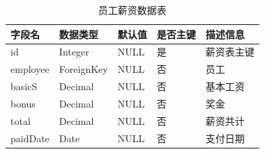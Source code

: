 \begin{table}[H]
    \centering
    \caption{员工薪资数据表}
    \label{tab:salarytab}
    \begin{tabularx}{.95\textwidth}{X<{\centering}X<{\centering}X<{\centering}X<{\centering}X<{\centering}}
        \toprule
        字段名 & 数据类型 & 默认值 & 是否主键 & 描述信息 \\
        \midrule
        id & Integer & NULL & 是 & 薪资表主键 \\
        employee & ForeignKey & NULL & 否 & 员工 \\
        basicS & Decimal & NULL & 否 & 基本工资 \\
        bonus & Decimal & NULL & 否 & 奖金 \\
        total & Decimal & NULL & 否 & 薪资共计 \\
        paidDate & Date & NULL & 否 & 支付日期 \\
        \bottomrule
    \end{tabularx}
\end{table}

